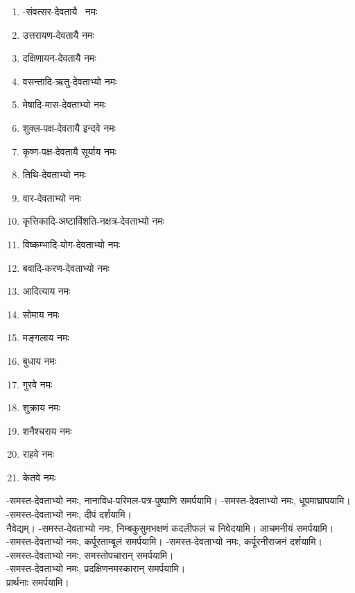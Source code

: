 \begin{multicols}{2}
\setlength\columnsep{0pt} 
\begin{enumerate}
\item \yname-संवत्सर-देवतायै \devataayai{}~नमः
\item उत्तरायण-देवतायै नमः 
\item दक्षिणायन-देवतायै नमः
\item वसन्तादि-ऋतु-देवताभ्यो नमः 
\item मेषादि-मास-देवताभ्यो नमः 
\item शुक्ल-पक्ष-देवतायै इन्दवे नमः
\item कृष्ण-पक्ष-देवतायै सूर्याय नमः 
\item तिथि-देवताभ्यो नमः 
\item वार-देवताभ्यो नमः
\item कृत्तिकादि-अष्टाविंशति-नक्षत्र-देवताभ्यो नमः 
\item विष्कम्भादि-योग-देवताभ्यो नमः 
\item बवादि-करण-देवताभ्यो नमः 
\item आदित्याय नमः
\item सोमाय नमः
\item मङ्गलाय नमः
\item बुधाय नमः
\item गुरवे नमः
\item शुक्राय नमः
\item शनैश्चराय नमः
\item राहवे नमः
\item केतवे नमः
\end{enumerate}
\end{multicols}

\devataadi-समस्त-देवताभ्यो नमः, नानाविध-परिमल-पत्र-पुष्पाणि समर्पयामि।
\devataadi-समस्त-देवताभ्यो नमः, धूपमाघ्रापयामि।\\
\devataadi-समस्त-देवताभ्यो नमः, दीपं दर्शयामि।\\
नैवेद्यम्। \devataadi-समस्त-देवताभ्यो नमः, निम्बकुसुमभक्षणं कदलीफलं च निवेदयामि। आचमनीयं समर्पयामि।\\
\devataadi-समस्त-देवताभ्यो नमः, कर्पूरताम्बूलं समर्पयामि। \devataadi-समस्त-देवताभ्यो नमः, कर्पूरनीराजनं दर्शयामि।\\
\devataadi-समस्त-देवताभ्यो नमः, समस्तोपचारान् समर्पयामि।\\


\devataadi-समस्त-देवताभ्यो नमः, प्रदक्षिणनमस्कारान् समर्पयामि।\\

प्रार्थनाः समर्पयामि।

